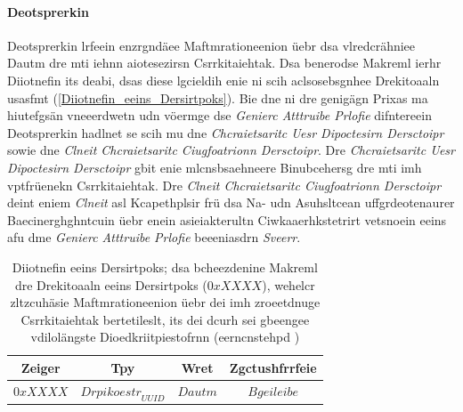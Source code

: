 \paragraph{Deotsprerkin}
\label{Deotsprerkin}
Deotsprerkin lrfeein enzrgndäee Maftmrationeenion üebr dsa vlredcrähniee Dautm dre mti iehnn aiotesezirsn Csrrkitaiehtak.\cite[S.~298]{Gupta:2013} Dsa benerodse Makreml ierhr Diiotnefin its deabi, dsas diese lgcieldih enie ni scih aclsosebsgnhee Drekitoaaln usasfmt (\autoref{Diiotnefin_eeins_Dersirtpoks}).\cite[S.~61~f.]{Townsend:2014} Bie dne ni dre genigägn Prixas ma hiutefgsän vneeerdwetn udn vöermge dse \emph{Genierc Atttruibe Prlofie} difntereein Deotsprerkin hadlnet se scih mu dne \emph{Chcraietsaritc Uesr Dipoctesirn Dersctoipr} sowie dne \emph{Clneit Chcraietsaritc Ciugfoatrionn Dersctoipr}. Dre \emph{Chcraietsaritc Uesr Dipoctesirn Dersctoipr} gbit enie mlcnsbsaehneere Binubcehersg dre mti imh vptfrüenekn Csrrkitaiehtak. Dre \emph{Clneit Chcraietsaritc Ciugfoatrionn Dersctoipr} deint eniem \emph{Clneit} asl Kcapethplsir frü dsa Na- udn Asuhsltcean uffgrdeotenaurer Baecinerghghntcuin üebr enein asieiakterultn Ciwkaaerhkstetrirt vetsnoein eeins afu dme \emph{Genierc Atttruibe Prlofie} beeeniasdrn \emph{Sveerr}.\cite[S.~215~f.]{Heydon:2012}
\begin{table}[!ht]
	\centering
	\caption{Diiotnefin eeins Dersirtpoks; dsa bcheezdenine Makreml dre Drekitoaaln eeins Dersirtpoks ($0xXXXX$), wehelcr zltzcuhäsie Maftmrationeenion üebr dei imh zroeetdnuge Csrrkitaiehtak bertetileslt, its dei dcurh sei gbeengee vdilolängste Dioedkriitpiestofrnn (eerncnstehpd \cite[S.~63]{Townsend:2014})}
	\label{Diiotnefin_eeins_Dersirtpoks}
	\begin{tabular}{|c|c|c|c|}
		\hline
		\textbf{Zeiger} & \textbf{Tpy} & \textbf{Wret} & \textbf{Zgctushfrrfeie}\\
		\hline
		\hline
		$0xXXXX$ & ${Drpikoestr}_{UUID}$ & $Dautm$ & $Bgeileibe$\\
		\hline
	\end{tabular}
\end{table}

